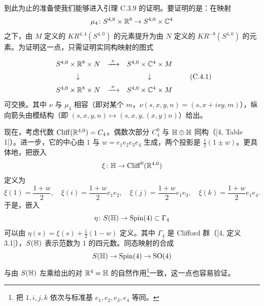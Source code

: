 
到此为止的准备使我们能够进入引理 C.3.9 的证明。要证明的是：在映射
\[
  \mu_4\colon S^{4,0}\times\mathbb{R}^8\to S^{4,0}\times\mathbb{C}^4
\]
之下，由 $M$ 定义的 $KR^{4,4}(S^{4,0})$ 的元素提升为由 $N$ 定义的 $KR^{-8}(S^{4,0})$ 的元素。为证明这一点，只需证明实同构映射的图式

\begin{equation}
  \begin{array}{ccc}
    S^{4,0}\times\mathbb{R}^8\times N & \xrightarrow{\ \nu\ } & S^{4,0}\times\mathbb{C}^4\times M\\[2mm]
    \downarrow & & \downarrow\\[2mm]
    S^{4,0}\times\mathbb{R}^8\times N & \xrightarrow{\ \nu\ } & S^{4,0}\times\mathbb{C}^4\times M
  \end{array} \tag{C.4.1}
\end{equation}
可交换。其中 $\nu$ 与 $\mu_4$ 相容（即对某个 $m$，$\nu(s,x,y,n)=(s,x+isy,m)$），纵向箭头由模结构（即 $(s,x,y,n)\mapsto(s,x,y,(x,y)n)$）给出。

现在，考虑代数 $\operatorname{Cliff}(\mathbb{R}^{4,0})=C_4$。偶数次部分 $C_4^0$ 与 $\mathbb{H}\oplus\mathbb{H}$ 同构（[4, Table 1]）。进一步，它的中心由 $1$ 与 $w=e_1e_2e_3e_4$ 生成，两个投影是 $\frac12(1\pm w)$。更具体地，把嵌入
\[
  \xi\colon \mathbb{H}\to\operatorname{Cliff}^0(\mathbb{R}^{4,0})
\]
定义为
\[
  \xi(1)=\frac{1+w}{2},\quad
  \xi(i)=\frac{1+w}{2}e_1e_2,\quad
  \xi(j)=\frac{1+w}{2}e_1e_3,\quad
  \xi(k)=\frac{1+w}{2}e_1e_4.
\]
于是，嵌入
\[
  \eta\colon S(\mathbb{H})\to\operatorname{Spin}(4)\subset\Gamma_4
\]
可以由 $\eta(s)=\xi(s)+\frac12(1-w)$ 定义。其中 $\Gamma_4$ 是 Clifford 群（[4, 定义 3.1]），$S(\mathbb{H})$ 表示范数为 1 的四元数。同态映射的合成
\[
  S(\mathbb{H})\to\operatorname{Spin}(4)\to\operatorname{SO}(4)
\]
与由 $S(\mathbb{H})$ 左乘给出的对 $\mathbb{R}^4=\mathbb{H}$ 的自然作用\footnote{把 $1,i,j,k$ 依次与标准基 $e_1,e_2,e_3,e_4$ 等同。}一致，这一点也容易验证。



